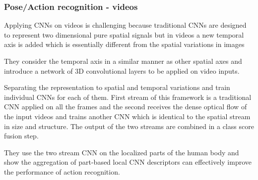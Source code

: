 \begin{frame}
\frametitle{Pose/Action recognition - videos}


Applying CNNs on videos is challenging because traditional CNNs are designed to represent two dimensional pure spatial signals but in videos a new temporal axis is added which is essentially different from the spatial variations in images

\medskip


They consider the temporal axis in a similar manner as other spatial axes and introduce a network of 3D convolutional layers to be applied on video inputs.

\medskip


Separating the representation to spatial and temporal variations and train individual CNNs for each of them. First stream of this framework is a traditional CNN applied on all the frames and the second receives the dense optical flow of the input videos and trains another CNN which is identical to the spatial stream in size and structure. The output of the two streams are combined in a class score fusion step.

\medskip


They use the two stream CNN on the localized parts of the human body and show the aggregation of part-based local CNN descriptors can effectively improve the performance of action recognition.

%
\end{frame}


